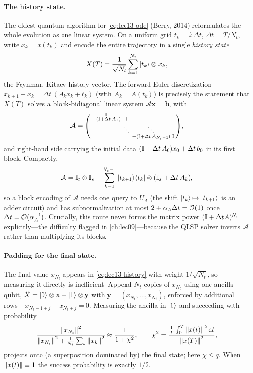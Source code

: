 \paragraph{The history state.}
The oldest quantum algorithm for \eqref{eq:lec13-ode} (Berry, 2014) reformulates the whole
evolution as one linear system. On a uniform grid $t_k=k\,\Delta t$, $\Delta t=T/N_t$, write
$x_k=x(t_k)$ and encode the entire trajectory in a single \emph{history state}
\begin{equation}
  X(T)=\frac{1}{\sqrt{N_t}}\sum_{k=1}^{N_t}\ket{t_k}\otimes x_k,
  \label{eq:lec13-history}
\end{equation}
the Feynman--Kitaev history vector. The forward Euler discretization
$x_{k+1}-x_k=\Delta t\,(A_k x_k+b_k)$ (with $A_k=A(t_k)$) is precisely the statement that
$X(T)$ solves a block-bidiagonal linear system $\mathcal A\mathbf x=\mathbf b$, with
\begin{equation}
  \mathcal A=
  \begin{psmallmatrix}
    \mathbb{I} & & & \\
    -(\mathbb{I}+\Delta t\,A_1) & \mathbb{I} & & \\
    & \ddots & \ddots & \\
    & & -(\mathbb{I}+\Delta t\,A_{N_t-1}) & \mathbb{I}
  \end{psmallmatrix},
  \label{eq:lec13-bigmatrix}
\end{equation}
and right-hand side carrying the initial data $(\mathbb{I}+\Delta t\,A_0)x_0+\Delta t\,b_0$ in its
first block. Compactly,
\begin{equation}
  \mathcal A=\mathbb{I}_t\otimes\mathbb{I}_s-\sum_{k=1}^{N_t-1}\ket{t_{k+1}}\!\bra{t_k}\otimes(\mathbb{I}_s+\Delta t\,A_k),
  \label{eq:lec13-bigmatrix-compact}
\end{equation}
so a block encoding of $\mathcal A$ needs one query to $U_A$ (the shift $\ket{t_k}\mapsto
\ket{t_{k+1}}$ is an adder circuit) and has subnormalization at most $2+\alpha_A\Delta t=\mathcal{O}(1)$
once $\Delta t=\mathcal{O}(\alpha_A^{-1})$. Crucially, this route never forms the matrix power
$(\mathbb{I}+\Delta t A)^{N_t}$ explicitly---the difficulty flagged in \cref{ch:lec09}---because the
QLSP solver inverts $\mathcal A$ rather than multiplying its blocks.

\paragraph{Padding for the final state.}
The final value $x_{N_t}$ appears in \eqref{eq:lec13-history} with weight $1/\sqrt{N_t}$, so
measuring it directly is inefficient. Append $N_t$ copies of $x_{N_t}$ using one ancilla qubit,
$\tilde X=\ket0\otimes\mathbf x+\ket1\otimes\mathbf y$ with $\mathbf y=(x_{N_t},\dots,x_{N_t})$,
enforced by additional rows $-x_{N_t-1+j}+x_{N_t+j}=0$. Measuring the ancilla in $\ket1$ and
succeeding with probability
\begin{equation}
  \frac{\left\lVert x_{N_t} \right\rVert^2}{\left\lVert x_{N_t} \right\rVert^2+\frac1{N_t}\sum_k\left\lVert x_k \right\rVert^2}
  \approx\frac{1}{1+\chi^2},
  \qquad
  \chi^2=\frac{\tfrac1T\int_0^T\left\lVert x(t) \right\rVert^2\mathrm{d} t}{\left\lVert x(T) \right\rVert^2},
  \label{eq:lec13-success}
\end{equation}
projects onto (a superposition dominated by) the final state; here $\chi\le q$. When
$\left\lVert x(t) \right\rVert\equiv1$ the success probability is exactly $1/2$.

